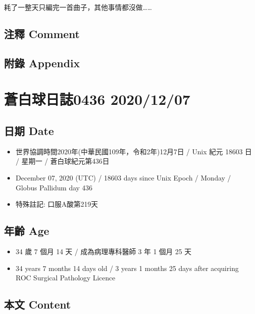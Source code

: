 \documentclass[a5paper, 10pt
]{book}
\providecommand{\tightlist}{%
  \setlength{\itemsep}{0pt}\setlength{\parskip}{0pt}}
\begin{document}
耗了一整天只編完一首曲子，其他事情都沒做\ldots\ldots{}

\hypertarget{ux6ce8ux91cb-comment-5}{%
\subsection{注釋 Comment}\label{ux6ce8ux91cb-comment-5}}

\hypertarget{ux9644ux9304-appendix-5}{%
\subsection{附錄 Appendix}\label{ux9644ux9304-appendix-5}}

\hypertarget{ux84bcux767dux7403ux65e5ux8a8c0436-20201207}{%
\section{蒼白球日誌0436
2020/12/07}\label{ux84bcux767dux7403ux65e5ux8a8c0436-20201207}}

\hypertarget{ux65e5ux671f-date-6}{%
\subsection{日期 Date}\label{ux65e5ux671f-date-6}}

\begin{itemize}
\tightlist
\item
  世界協調時間2020年(中華民國109年，令和2年)12月7日 / Unix 紀元 18603 日
  / 星期一 / 蒼白球紀元第436日
\item
  December 07, 2020 (UTC) / 18603 days since Unix Epoch / Monday /
  Globus Pallidum day 436
\item
  特殊註記: 口服A酸第219天
\end{itemize}

\hypertarget{ux5e74ux9f61-age-6}{%
\subsection{年齡 Age}\label{ux5e74ux9f61-age-6}}

\begin{itemize}
\tightlist
\item
  34 歲 7 個月 14 天 / 成為病理專科醫師 3 年 1 個月 25 天
\item
  34 years 7 months 14 days old / 3 years 1 months 25 days after
  acquiring ROC Surgical Pathology Licence
\end{itemize}

\hypertarget{ux672cux6587-content-6}{%
\subsection{本文 Content}\label{ux672cux6587-content-6}}
\end{document}
